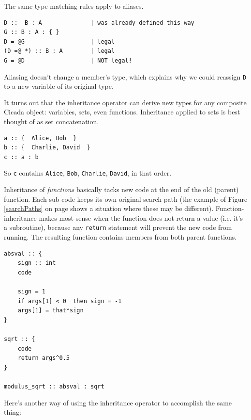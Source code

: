 \documentclass{article}
\newenvironment{code}{
       \begin{list}{}{
               \setlength{\leftmargin}{.4in}
               \setlength{\rightmargin}{0in}
               \setlength{\topsep}{.2in}
       }
       \small
       \item[] }
       { \end{list}   }
\begin{document}
The same type-matching rules apply to aliases.

\begin{code} \begin{verbatim}
D ::  B : A              | was already defined this way
G :: B : A : { }
D = @G                   | legal
(D =@ *) :: B : A        | legal
G = @D                   | NOT legal!
\end{verbatim} \end{code}

\noindent Aliasing doesn't change a member's type, which explains why we could reassign \verb#D# to a new variable of its original type.

It turns out that the inheritance operator can derive new types for any composite Cicada object:  variables, sets, even functions.  Inheritance applied to sets is best thought of as set concatenation.

\begin{code} \begin{verbatim}
a :: {  Alice, Bob  }
b :: {  Charlie, David  }
c :: a : b
\end{verbatim} \end{code}

\noindent So \texttt{c} contains \texttt{Alice}, \texttt{Bob}, \texttt{Charlie}, \texttt{David}, in that order.

Inheritance of \emph{functions} basically tacks new code at the end of the old (parent) function.  Each sub-code keeps its own original search path (the example of Figure \ref{searchPaths} on page \pageref{searchPaths} shows a situation where these may be different).  Function-inheritance makes most sense when the function does not return a value (i.e. it's a subroutine), because any \verb#return# statement will prevent the new code from running.  The resulting function contains members from both parent functions.

\begin{code} \begin{verbatim}
absval :: {
    sign :: int
    code
    
    sign = 1
    if args[1] < 0  then sign = -1
    args[1] = that*sign
}

sqrt :: {
    code
    return args^0.5
}

modulus_sqrt :: absval : sqrt
\end{verbatim} \end{code}

Here's another way of using the inheritance operator to accomplish the same thing:
\end{document}
